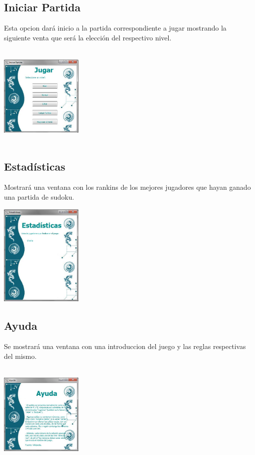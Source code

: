 \documentclass[12pt]{article}
\begin{document}
	\subsection{Iniciar Partida}
		Esta opcion dará inicio a la partida correspondiente a jugar mostrando la siguiente venta que será la elección del respectivo nivel.

	\begin{center}
		\includegraphics[height=5cm,width=4cm]{jugar.jpg}
	\end{center}


	\subsection{Estadísticas}
		Mostrará una ventana con los rankins de los mejores jugadores que hayan ganado una partida de sudoku.

	\begin{center}
		\includegraphics[height=5cm,width=4cm]{estadisticas.jpg}
	\end{center}

	\subsection{Ayuda}
		Se mostrará una ventana con una introduccion del juego y las reglas respectivas del mismo.

	\begin{center}
		\includegraphics[height=5cm,width=4cm]{ayuda.jpg}
	\end{center}
\end{document}
